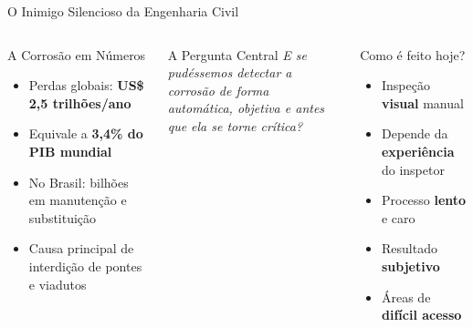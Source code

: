 \documentclass[aspectratio=169, 12pt]{beamer}
\begin{document}
\begin{frame}{O Inimigo Silencioso da Engenharia Civil}
    \begin{columns}[T]
        \begin{block}{A Corrosão em Números}
            \begin{itemize}
                \item Perdas globais: \textbf{US\$ 2,5 trilhões/ano}
                \item Equivale a \textbf{3,4\% do PIB mundial}
                \item No Brasil: bilhões em manutenção e substituição
                \item Causa principal de interdição de pontes e viadutos
            \end{itemize}
        \end{block}

        \vspace{0.3cm}
        \begin{alertblock}{A Pergunta Central}
            \textit{E se pudéssemos detectar a corrosão de forma\\automática, objetiva e antes que ela se torne crítica?}
        \end{alertblock}

        \begin{block}{Como é feito hoje?}
            \begin{itemize}
                \item[\faEye] Inspeção \textbf{visual} manual
                \item[\faUserClock] Depende da \textbf{experiência} do inspetor
                \item[\faClock] Processo \textbf{lento} e caro
                \item[\faExclamationTriangle] Resultado \textbf{subjetivo}
                \item[\faMapMarkerAlt] Áreas de \textbf{difícil acesso}
            \end{itemize}
        \end{block}
    \end{columns}
\end{frame}
\end{document}
